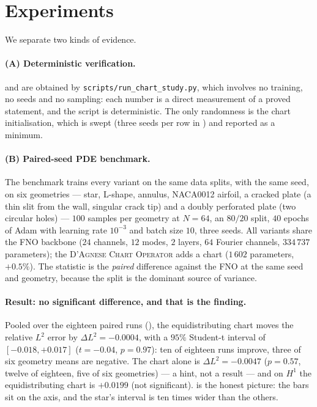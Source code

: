 \documentclass[11pt,a4paper]{article}
\theoremstyle{plain}
\theoremstyle{definition}
\newcommand{\DAO}{\textsc{D'Agnese Chart Operator}}
\newcommand{\code}[1]{\texttt{#1}}
\begin{document}
\section{Experiments}
\label{sec:experiments}

We separate two kinds of evidence.

\paragraph{(A) Deterministic verification.}  
and  are obtained by
\code{scripts/run\_chart\_study.py}, which involves no training, no seeds and no
sampling: each number is a direct measurement of a proved statement, and the
script is deterministic.  The only randomness is the chart initialisation, which
is swept (three seeds per row in ) and reported as a
minimum.

\paragraph{(B) Paired-seed PDE benchmark.}  The benchmark trains every variant on
the same data splits, with the same seed, on six geometries --- star, L-shape,
annulus, NACA0012 airfoil, a cracked plate (a thin slit from the wall, singular
crack tip) and a doubly perforated plate (two circular holes) --- $100$ samples
per geometry at $N=64$, an $80/20$ split, $40$ epochs of Adam with learning rate
$10^{-3}$ and batch size $10$, three seeds.  All variants share the FNO backbone ($24$ channels, $12$ modes,
$2$ layers, $64$ Fourier channels, $334\,737$ parameters); the
\DAO{} adds a chart ($1\,602$ parameters, $+0.5\%$).  The statistic is the
\emph{paired} difference against the FNO at the same seed and geometry, because
the split is the dominant source of variance.



\paragraph{Result: no significant difference, and that is the finding.}  Pooled
over the eighteen paired runs (), the equidistributing chart
moves the relative $L^2$ error by $\Delta L^2=-0.0004$, with a $95\%$ Student-t
interval of $[-0.018,+0.017]$ ($t=-0.04$, $p=0.97$): ten of eighteen runs improve,
three of six geometry means are negative.  The chart alone is
$\Delta L^2=-0.0047$ ($p=0.57$, twelve of eighteen, five of six geometries) ---
a hint, not a result --- and on $H^1$ the equidistributing chart is $+0.0199$
(not significant).   is the honest picture: the bars sit on
the axis, and the star's interval is ten times wider than the others.
\end{document}
